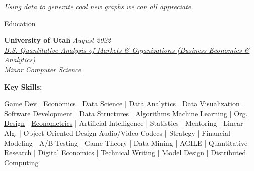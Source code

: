 \documentclass{resume/resume}
\begin{document}

\begin{center}
 \vspace{-1em}
 {\em
    Using data to generate cool new graphs we can all appreciate.
 }
 \vspace{-10pt}
\end{center}


\begin{rSection}{Education}

{\bf University of Utah} \hfill {\em August 2022}
\vspace{2pt}
\emph{
    \\ \href{https://eccles.utah.edu/programs/undergraduate/academics/majors/qamo/}{B.S. Quantitative Analysis of Markets \& Organizations (Business Economics \& Analytics)}
    \\ \href{https://github.com/search?o=desc&q=user\%3ASpelkington&s=updated&type=Repositories}{Minor Computer Science}
}


{\bf Key Skills:}
\vspace{-1.83em}

\begin{adjustwidth}{6em}{0pt}
    \href{https://spelkington.github.io/Because-I-Cannot-Draw/}{Game Dev} |  %
    \href{https://www.youtube.com/watch?v=lMFQp3wN-cg}{Economics} |  %
    \href{https://github.com/Spelkington/mlearning}{Data Science} |  %
    \href{https://github.com/UtahTriangle/Laws/blob/main/Proposals/NationalsHelp/figures/distances.pdf}{Data Analytics} |  %
    \href{https://spelkington.github.io/assets/utah_office_update.pdf}{Data Visualization} |  %
    \href{https://github.com/spelkington}{Software Development} |
    \href{https://www.youtube.com/watch?v=lMFQp3wN-cg}{Data Structures | Algorithms}
    \href{https://github.com/Spelkington/mlearning}{Machine Learning} |  %
    \href{https://spelkington.github.io/assets/utah_office_update.pdf}{Org. Design} |  %
    \href{https://github.com/Spelkington/econometrics}{Econometrics} |  %
    Artificial Intelligence | 
    Statistics |
    Mentoring |
    Linear Alg. | 
    Object-Oriented Design
    Audio/Video Codecs | 
    Strategy |
    Financial Modeling |
    A/B Testing | 
    Game Theory | 
    Data Mining | 
    AGILE | 
    Quantitative Research |
    Digital Economics | 
    Technical Writing |
    Model Design | 
    Distributed Computing
    

\end{adjustwidth}
\end{rSection}
\end{document}
